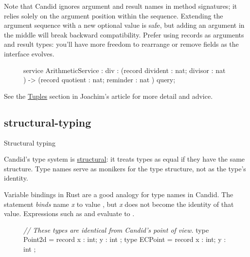 \documentclass{article}
\begin{document}
Note that Candid ignores argument and result names in method signatures; it relies solely on the argument position within the sequence.
Extending the argument sequence with a new optional value is safe, but adding an argument in the middle will break backward compatibility.
Prefer using records as arguments and result types: you'll have more freedom to rearrange or remove fields as the interface evolves.

\begin{figure}
\begin{code}[candid]
service ArithmeticService : {
  div : (record { divident : nat; divisor : nat })
     -> (record { quotient : nat; reminder : nat }) query;
}
\end{code}
\end{figure}

See the \href{https://www.joachim-breitner.de/blog/786-A_Candid_explainer__Quirks#tuples}{Tuples} section in Joachim's article for more detail and advice.

\subsection{structural-typing}{Structural typing}

Candid's type system is \href{https://en.wikipedia.org/wiki/Structural_type_system}{structural}: it treats types as equal if they have the same structure.
Type names serve as monikers for the type structure, not as the type's identity.

Variable bindings in Rust are a good analogy for type names in Candid.
The  statement \emph{binds} name \emph{x} to value , but \emph{x} does not become the identity of that value.
Expressions such as  and  evaluate to .

\begin{figure}

\begin{code}[candid]
\emph{// These types are identical from Candid's point of view.}
type Point2d = record { x : int; y : int };
type ECPoint = record { x : int; y : int };
\end{code}
\end{figure}
\end{document}
